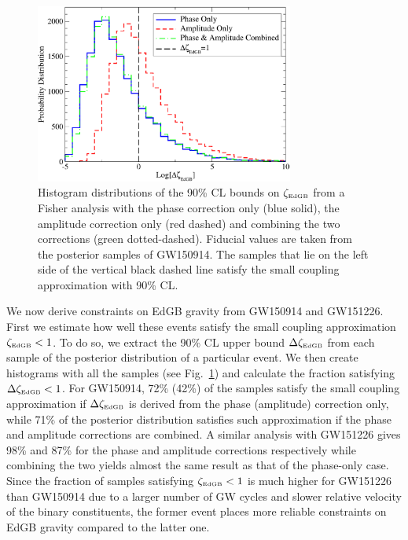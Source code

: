 \documentclass[prd,twocolumn,nofootinbib]{revtex4-1}
\newcommand{\EDGB}{{\mbox{\tiny EdGB}}}
\begin{document}
\begin{figure}[htb]
\includegraphics[width=8.5cm]{histogram-gw150914.pdf}
\caption{Histogram distributions of the 90\% CL bounds on $\zeta_{\EDGB}$ from a Fisher analysis with the phase correction only (blue solid), the amplitude correction only (red dashed) and combining the two corrections (green dotted-dashed). Fiducial values are taken from the posterior samples of GW150914. The samples that lie on the left side of the vertical black dashed line satisfy the small coupling approximation with 90\% CL.}
\label{fig:histogram-edgb}
\end{figure}


We now derive constraints on EdGB gravity from GW150914 and GW151226. First we estimate how well these events satisfy the small coupling approximation $\zeta_{\EDGB}<1$. To do so, we extract the 90\% CL upper bound $\Delta\zeta_{\EDGB}$ from each sample of the posterior distribution of a particular event. We then create histograms with all the samples (see Fig.~\ref{fig:histogram-edgb}) and calculate the fraction satisfying $\Delta\zeta_{\EDGB}<1$.  For GW150914, 72\% (42\%) of the samples satisfy the small coupling approximation if $\Delta\zeta_{\EDGB}$ is derived from the phase (amplitude) correction only, while 71\% of the posterior distribution satisfies such approximation if the phase and amplitude corrections are combined. A similar analysis with GW151226 gives 98\% and 87\% for the phase and amplitude corrections respectively while combining the two yields almost the same result as that of the phase-only case. Since the fraction of samples satisfying $\zeta_{\EDGB}<1$ is much higher for GW151226 than GW150914 due to a larger number of GW cycles and slower relative velocity of the binary constituents, the former event places more reliable constraints on EdGB gravity compared to the latter one.
\end{document}
